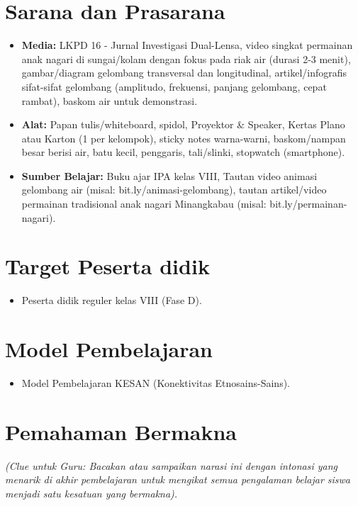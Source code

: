 \documentclass[12pt,a4paper]{article}
\begin{document}
\section{Sarana dan Prasarana}

\begin{itemize}
\item \textbf{Media:} LKPD 16 - Jurnal Investigasi Dual-Lensa, video singkat permainan anak nagari di sungai/kolam dengan fokus pada riak air (durasi 2-3 menit), gambar/diagram gelombang transversal dan longitudinal, artikel/infografis sifat-sifat gelombang (amplitudo, frekuensi, panjang gelombang, cepat rambat), baskom air untuk demonstrasi.
\item \textbf{Alat:} Papan tulis/whiteboard, spidol, Proyektor \& Speaker, Kertas Plano atau Karton (1 per kelompok), sticky notes warna-warni, baskom/nampan besar berisi air, batu kecil, penggaris, tali/slinki, stopwatch (smartphone).
\item \textbf{Sumber Belajar:} Buku ajar IPA kelas VIII, Tautan video animasi gelombang air (misal: bit.ly/animasi-gelombang), tautan artikel/video permainan tradisional anak nagari Minangkabau (misal: bit.ly/permainan-nagari).
\end{itemize}

\section{Target Peserta didik}

\begin{itemize}
\item Peserta didik reguler kelas VIII (Fase D).
\end{itemize}

\section{Model Pembelajaran}

\begin{itemize}
\item Model Pembelajaran KESAN (Konektivitas Etnosains-Sains).
\end{itemize}

\section{Pemahaman Bermakna}
\textit{(Clue untuk Guru: Bacakan atau sampaikan narasi ini dengan intonasi yang menarik di akhir pembelajaran untuk mengikat semua pengalaman belajar siswa menjadi satu kesatuan yang bermakna).}
\end{document}

